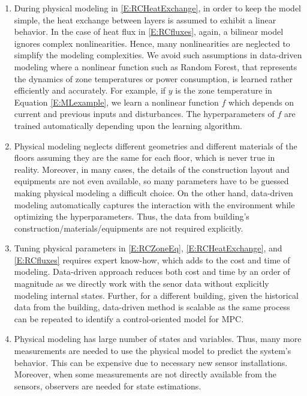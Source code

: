 \begin{enumerate}
	\item \textcolor[rgb]{0,0,1}{
	During physical modeling in \eqref{E:RCHeatExchange}, in order to keep the model simple, the heat exchange between layers is assumed to exhibit a linear behavior. 
	In the case of heat flux in \eqref{E:RCfluxes}, again, a bilinear model ignores complex nonlinearities.
	Hence, many nonlinearities are neglected to simplify the modeling complexities.
	We avoid such assumptions in data-driven modeling where a nonlinear function such as Random Forest, that represents the dynamics of zone temperatures or power consumption, is learned rather efficiently and accurately. 
	For example, if \(y\) is the zone temperature in Equation \eqref{E:MLexample}, we learn a nonlinear function \(f\) which depends on current and previous inputs and disturbances. 
	The hyperparameters of \(f\) are trained automatically depending upon the learning algorithm.}
	\item \textcolor[rgb]{0,0,1}{
	Physical modeling neglects different geometries and different materials of the floors assuming they are the same for each floor, which is never true in reality.
	Moreover, in many cases, the details of the construction layout and equipments are not even available, so many parameters have to be guessed making physical modeling a difficult choice.
	On the other hand, data-driven modeling automatically captures the interaction with the environment while optimizing the hyperparameters. Thus, the data from building's construction/materials/equipments are not required explicitly.}
	\item \textcolor[rgb]{0,0,1}{
	Tuning physical parameters in \eqref{E:RCZoneEq}, \eqref{E:RCHeatExchange}, and \eqref{E:RCfluxes} requires expert know-how, which adds to the cost and time of modeling.
	Data-driven approach reduces both cost and time by an order of magnitude as we directly work with the senor data without explicitly modeling internal states.
	Further, for a different building, given the historical data from the building, data-driven method is scalable as the same process can be repeated to identify a control-oriented model for MPC.}
	\item \textcolor[rgb]{0,0,1}{
	Physical modeling has large number of states and variables.
	Thus, many more measurements are needed to use the physical model to predict the system's behavior.
	This can be expensive due to necessary new sensor installations.
	Moreover, when some measurements are not directly available from the sensors, observers are needed for state estimations.
}
\end{enumerate}
